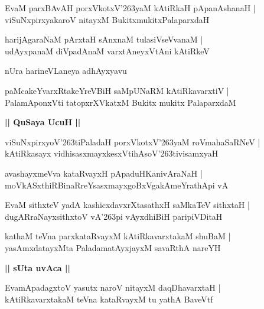 \documentclass[twoside,12pt,openright]{book}
\def\S{\char'263}
\newcounter{shloka}[chapter]
\def\uvaca#1{\centerline{{\large\textbf{#1}}}}
\begin{document}
\begin{shloka}%
EvaM parxBAvAH porxVkotxV\S yaM kAtiRkaH pApanAshanaH |\\
viSuNxpirxyakaroV nitayxM BukitxmukitxPalaparxdaH 
\end{shloka}

\begin{shloka}%
harijAgaraNaM pArxtaH sAnxnaM tulasiVseVvanaM |\\
udAyxpanaM diVpadAnaM varxtAneyxVtAni kAtiRkeV
\end{shloka}

\begin{center}
nUra harineVLaneya adhAyxyavu
\end{center}

\begin{shloka}%
paMcakeYvarxRtakeYreVBiH saMpUNaRM kAtiRkavarxtiV |\\
PalamAponxVti tatopxrXVkatxM Bukitx mukitx PalaparxdaM 
\end{shloka}

\uvaca{|| QuSaya UcuH ||}

\begin{shloka}%
viSuNxpirxyoV\S tiPaladaH porxVkotxV\S yaM roVmahaSaRNeV |\\
kAtiRkasayx vidhisasxmayxkesxVtihAsoV\S tivisamxyaH 
\end{shloka}

\begin{shloka}%
avashayxmeVva kataRvayxH pApaduHKanivAraNaH |\\
moVkASxthiRBinaRreYsasxmayxgoBxVgakAmeYrathApi vA
\end{shloka}

\begin{shloka}%
EvaM sithxteV yadA kashicxdavxrXtasathxH saMkaTeV sithxtaH |\\
dugARraNayxsithxtoV vA\S pi vAyxdhiBiH paripiVDitaH 
\end{shloka}

\begin{shloka}%
kathaM teVna parxkataRvayxM kAtiRkavarxtakaM shuBaM |\\
yasAmxdatayxMta PaladamatAyxjayxM savaRthA nareYH 
\end{shloka}

\uvaca{|| sUta uvAca ||}

\begin{shloka}%
EvamApadagxtoV yasutx naroV nitayxM daqDhavarxtaH |\\
kAtiRkavarxtakaM teVna kataRvayxM tu yathA BaveVtf 
\end{shloka}
\end{document}
